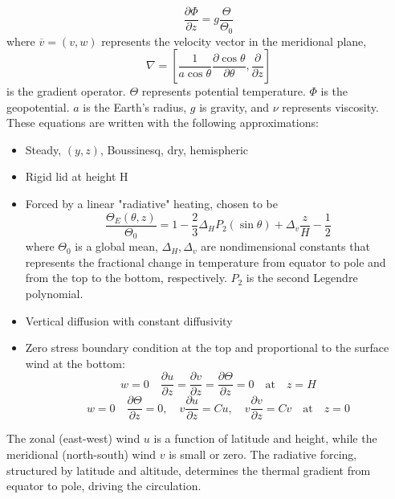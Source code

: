 \[
	\frac{\partial \Phi}{\partial z} = g \frac{\Theta}{\Theta_0}
\]
where $\overline{v}=(v,w)$ represents the velocity vector in the meridional plane, $$\nabla=\left[\frac{1}{a\cos\theta}\frac{\partial\cos\theta}{\partial\theta}, \frac{\partial}{\partial z}\right]$$ is the gradient operator.
$\Theta$ represents potential temperature.
$\Phi$ is the geopotential.
$a$ is the Earth's radius, $g$ is gravity, and $\nu$ represents viscosity.
These equations are written with the following approximations:
\begin{itemize}
	\item Steady, $(y,z)$, Boussinesq, dry, hemispheric
	\item Rigid lid at height H
	\item Forced by a linear "radiative" heating, chosen to be $$\frac{\Theta_E(\theta,z)}{\Theta_0}=1 - \frac{2}{3} \Delta_H P_2(\sin\theta) + \Delta_v \frac{z}{H} - \frac{1}{2}$$ where $\Theta_0$ is a global mean, $\Delta_H, \Delta_v$ are nondimensional constants that represents the fractional change in temperature from equator to pole and from the
	      top to the bottom, respectively. $P_2$ is the second Legendre polynomial.
	\item Vertical diffusion with constant diffusivity
	\item Zero stress boundary condition at the top and proportional to the surface wind at the bottom:
	      $$w=0\quad\frac{\partial u}{\partial z}=\frac{\partial v}{\partial z}=\frac{\partial\Theta}{\partial z}=0\quad\text{at}\quad z=H$$
	      $$w=0\quad\frac{\partial \Theta}{\partial z}=0,\quad v\frac{\partial u}{\partial z}=Cu,\quad v\frac{\partial v}{\partial z}=Cv\quad\text{at}\quad z=0$$
\end{itemize}

The zonal (east-west) wind $u$ is a function of latitude and height, while the meridional (north-south) wind $v$ is small or zero. The radiative forcing, structured by latitude and altitude, determines the thermal gradient from equator to pole, driving the circulation.


